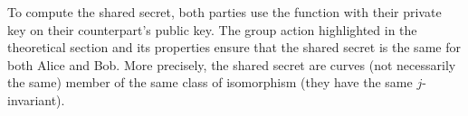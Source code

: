 \documentclass[../main.tex]{subfilesubs}
\begin{document}
To compute the shared secret, both parties use the function  with their private key on their counterpart's public key.
The group action highlighted in the theoretical section and its properties ensure that the shared secret is the same for both Alice and Bob.
More precisely, the shared secret are curves (not necessarily the same) member of the same class of isomorphism (they have the same $j$-invariant).
\end{document}
